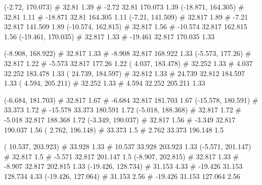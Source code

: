 \documentclass[a4paper,openbib,10pt]{article}
\newenvironment{treegraph}{\begin{graph}}{\end{graph}}
\begin{document}
\begin{treegraph}
  (-2.72, 170.073) #     32.81    1.39
   #    -2.72    32.81    170.073    1.39
  (-18.871, 164.305) #     32.81    1.11
   #    -18.871    32.81    164.305    1.11
  (-7.21, 141.509) #     32.817    1.89
   #    -7.21    32.817    141.509    1.89
  (-10.574, 162.815) #     32.817    1.56
   #    -10.574    32.817    162.815    1.56
  (-19.461, 170.035) #     32.817    1.33
   #    -19.461    32.817    170.035    1.33

  (-8.908, 168.922) #     32.817    1.33
   #    -8.908    32.817    168.922    1.33
  (-5.573, 177.26) #     32.817    1.22
   #    -5.573    32.817    177.26    1.22
  ( 4.037, 183.478) #     32.252    1.33
   #    4.037    32.252    183.478    1.33
  ( 24.739, 184.597) #     32.812    1.33
   #    24.739    32.812    184.597    1.33
  ( 4.594, 205.211) #     32.252    1.33
   #    4.594    32.252    205.211    1.33

  (-6.684, 181.703) #     32.817    1.67
   #    -6.684    32.817    181.703    1.67
  (-15.578, 180.591) #     33.373    1.72
   #    -15.578    33.373    180.591    1.72
  (-5.018, 188.368) #     32.817    1.72
   #    -5.018    32.817    188.368    1.72
  (-3.349, 190.037) #     32.817    1.56
   #    -3.349    32.817    190.037    1.56
  ( 2.762, 196.148) #     33.373    1.5
   #    2.762    33.373    196.148    1.5

  ( 10.537, 203.923) #     33.928    1.33
   #    10.537    33.928    203.923    1.33
  (-5.571, 201.147) #     32.817    1.5
   #    -5.571    32.817    201.147    1.5
  (-8.907, 202.815) #     32.817    1.33
   #    -8.907    32.817    202.815    1.33
  (-19.426, 128.734) #     31.153    4.33
   #    -19.426    31.153    128.734    4.33
  (-19.426, 127.064) #     31.153    2.56
   #    -19.426    31.153    127.064    2.56


\end{treegraph}
\end{document}
